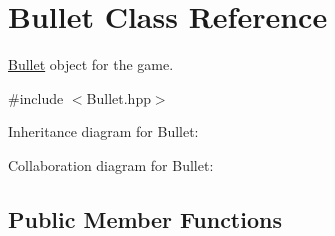 \hypertarget{class_bullet}{\section{Bullet Class Reference}
\label{class_bullet}
}


\hyperlink{class_bullet}{Bullet} object for the game.  




{\ttfamily \#include $<$Bullet.\+hpp$>$}



Inheritance diagram for Bullet\+:


Collaboration diagram for Bullet\+:
\subsection*{Public Member Functions}

